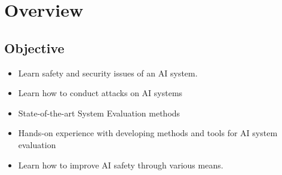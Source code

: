 \newpage
\section{Overview}

\subsection{Objective}
\begin{itemize}
    \item Learn safety and security issues of an AI system.
    \item Learn how to conduct attacks on AI systems
    \item State-of-the-art System Evaluation methods
    \item Hands-on experience with developing methods and tools for AI system evaluation
    \item Learn how to improve AI safety through various means.
\end{itemize}
